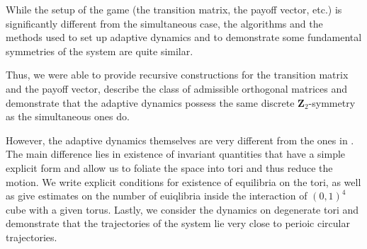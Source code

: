 \documentclass{article}
\theoremstyle{definition}
\numberwithin{equation}{section}
\begin{document}
While the setup of the game (the transition matrix, the payoff vector, etc.) is significantly different from the simultaneous case, the algorithms and the methods used to set up adaptive dynamics and to demonstrate some fundamental symmetries of the system are quite similar.

Thus, we were able to provide recursive constructions for the transition matrix and the payoff vector, describe the class of admissible orthogonal matrices and demonstrate that the adaptive dynamics possess the same discrete $\mathbf{Z}_2$-symmetry as the simultaneous ones do. 

However, the adaptive dynamics themselves are very different from the ones in  \cite{balabanova2024adaptive}. The main difference lies in existence of invariant quantities that have a simple explicit form and allow us to foliate the space into tori and thus reduce the motion.  We write explicit conditions for existence of equilibria on the tori, as well as give estimates on the number of euiqlibria inside the interaction of $(0,1)^4$ cube with  a given torus. Lastly, we consider the dynamics on degenerate tori and demonstrate that the trajectories of the system lie very close to perioic circular trajectories.  
\end{document}
